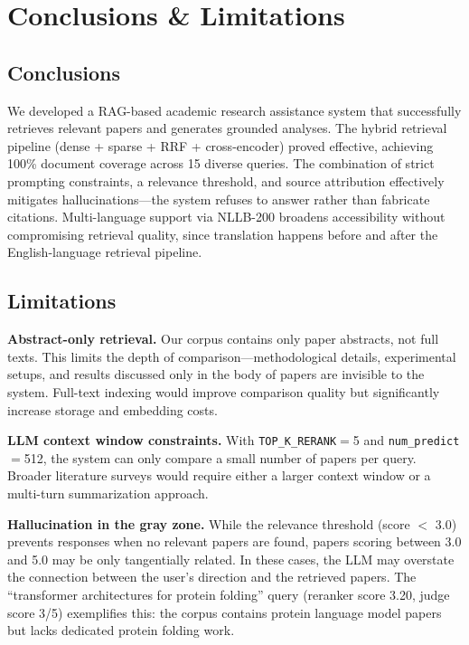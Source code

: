 \documentclass[11pt,a4paper]{article}
\begin{document}
\section{Conclusions \& Limitations}

\subsection{Conclusions}

We developed a RAG-based academic research assistance system that successfully retrieves relevant papers and generates grounded analyses. The hybrid retrieval pipeline (dense + sparse + RRF + cross-encoder) proved effective, achieving 100\% document coverage across 15 diverse queries. The combination of strict prompting constraints, a relevance threshold, and source attribution effectively mitigates hallucinations---the system refuses to answer rather than fabricate citations. Multi-language support via NLLB-200 broadens accessibility without compromising retrieval quality, since translation happens before and after the English-language retrieval pipeline.

\subsection{Limitations}

\textbf{Abstract-only retrieval.} Our corpus contains only paper abstracts, not full texts. This limits the depth of comparison---methodological details, experimental setups, and results discussed only in the body of papers are invisible to the system. Full-text indexing would improve comparison quality but significantly increase storage and embedding costs.

\textbf{LLM context window constraints.} With \texttt{TOP\_K\_RERANK}$=$5 and \texttt{num\_predict}$=$512, the system can only compare a small number of papers per query. Broader literature surveys would require either a larger context window or a multi-turn summarization approach.

\textbf{Hallucination in the gray zone.} While the relevance threshold (score $<$ 3.0) prevents responses when no relevant papers are found, papers scoring between 3.0 and 5.0 may be only tangentially related. In these cases, the LLM may overstate the connection between the user's direction and the retrieved papers. The ``transformer architectures for protein folding'' query (reranker score 3.20, judge score 3/5) exemplifies this: the corpus contains protein language model papers but lacks dedicated protein folding work.
\end{document}
